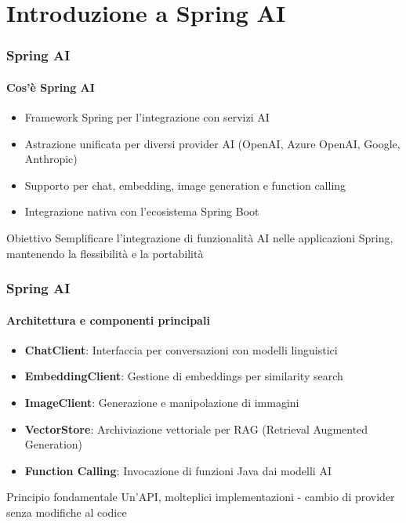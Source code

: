 \section{Introduzione a Spring AI} %
\label{sec:spring-ai-intro}

\begin{frame}[t] \frametitle{Spring AI}
    \framesubtitle{Cos'è Spring AI}
    \begin{itemize}[leftmargin=10pt,align=right]
        \item[\alert{\faLightbulbO}] Framework Spring per l'integrazione con servizi AI
        \item[\alert{\faLightbulbO}] Astrazione unificata per diversi provider AI (OpenAI, Azure OpenAI, Google, Anthropic)
        \item[\alert{\faLightbulbO}] Supporto per chat, embedding, image generation e function calling
        \item[\alert{\faLightbulbO}] Integrazione nativa con l'ecosistema Spring Boot
    \end{itemize}
    
    \vspace{1cm}
    \begin{block}{Obiettivo}
        Semplificare l'integrazione di funzionalità AI nelle applicazioni Spring, mantenendo la flessibilità e la portabilità
    \end{block}
\end{frame}

\begin{frame}[t] \frametitle{Spring AI}
    \framesubtitle{Architettura e componenti principali}
    \begin{itemize}[leftmargin=10pt,align=right]
        \item[\alert{\faCogs}] \textbf{ChatClient}: Interfaccia per conversazioni con modelli linguistici
        \item[\alert{\faCogs}] \textbf{EmbeddingClient}: Gestione di embeddings per similarity search
        \item[\alert{\faCogs}] \textbf{ImageClient}: Generazione e manipolazione di immagini
        \item[\alert{\faCogs}] \textbf{VectorStore}: Archiviazione vettoriale per RAG (Retrieval Augmented Generation)
        \item[\alert{\faCogs}] \textbf{Function Calling}: Invocazione di funzioni Java dai modelli AI
    \end{itemize}
    
    \vspace{0.5cm}
    \begin{alertblock}{Principio fondamentale}
        Un'API, molteplici implementazioni - cambio di provider senza modifiche al codice
    \end{alertblock}
\end{frame}

